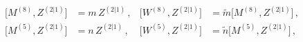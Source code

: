\begin{equation}
\label{Z21}
\begin{aligned}
{}\big[M^{(8)}, Z^{(2|1)}\big] &= m\, Z^{(2|1)}\,,  &  \big[W^{(8)},
Z^{(2|1)}\big] &= \tilde{m} \big[M^{(8)}, Z^{(2|1)}\big] \,, \\
{}\big[M^{(5)}, Z^{(2|1)}\big] &= n\, Z^{(2|1)}\,,  &  \big[W^{(5)},
Z^{(2|1)}\big] &= \tilde{n} \big[M^{(5)}, Z^{(2|1)}\big]\, ,
\end{aligned}
\end{equation}

